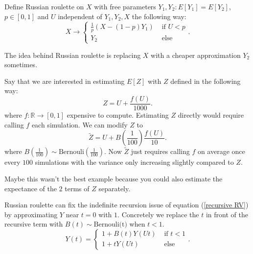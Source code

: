 \documentclass[a4paper,12pt]{article}
\begin{document}
\begin{definition} \label{Russian roulette}
    Define Russian roulette on $X$ with free parameters
    $Y_{1},Y_{2}: E[Y_{1}] = E[Y_{2}]$, $p \in [0,1]$ and $U$
    independent of $Y_{1},Y_{2},X$ the following way:
    \[
        X \rightarrow \begin{cases}
            \frac{1}{p}(X- (1-p)Y_{1}) & \text{ if } U<p \\
            Y_{2}                      & \text{ else }
        \end{cases}
        .\]
\end{definition}
The idea behind Russian roulette is replacing $X$ with a cheaper approximation $Y_{2}$
sometimes.

\begin{example}
    Say that we are interested in estimating $E[Z]$ with $Z$
    defined in the following way:
    \[
        Z = U + \frac{f(U)}{1000}
        .\]
    where $f:\mathbb{R} \rightarrow [0,1]$ expensive to compute.
    Estimating $Z$ directly would require calling $f$ each
    simulation. We can modify $Z$ to
    \[
        \tilde{Z} = U + B\left(\frac{1}{100}\right)\frac{f(U)}{10}
        .\]
    where $B(\frac{1}{100}) \sim \text{Bernouli}(\frac{1}{100})$. Now $\tilde{Z}$
    just requires calling $f$ on average once every $100$ simulations with the variance
    only increasing slightly compared to $Z$.
\end{example}

Maybe this wasn't the best example because you could also estimate the expectance of the
$2$ terms of $Z$ separately.

\begin{example}
    Russian roulette can fix the indefinite recursion issue of
    equation (\ref{recursive RV}) by approximating $Y$ near $t = 0$ with $1$. Concretely
    we replace the $t$ in front of the recursive term with $B(t) \sim \text{Bernouli(t)}$
    when $t<1$.
    \[
        Y(t) =
        \begin{cases}
            1 + B(t)Y(Ut) & \text{ if } t<1 \\
            1 + tY(Ut)    & \text{ else}
        \end{cases}
        .\]
\end{example}

\vspace{0.2cm}

\begin{pythonn}
\end{pythonn}
\end{document}

